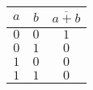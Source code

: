 \documentclass{article}
\begin{document}
\begin{minipage}[t][\textheight-1ex][t]{0.38\linewidth}
\begin{Row}
\begin{Cell}{6}
\begin{tabular}{cc|c}
                $a$ & $b$ & $\overline{a+b}$ \\
                \midrule
                $0$ & $0$ & $1$              \\
                $0$ & $1$ & $0$              \\
                $1$ & $0$ & $0$              \\
                $1$ & $1$ & $0$              \\
                \bottomrule
            \end{tabular}
            \vspace{1ex}
        \end{Cell}
    \end{Row}
\end{minipage}
\end{document}
